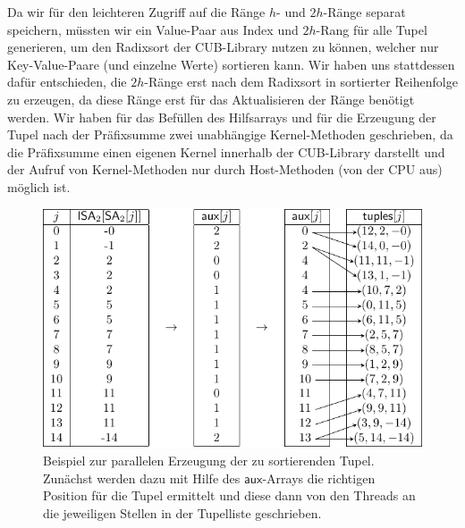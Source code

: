 Da wir für den leichteren Zugriff auf die Ränge $h$- und $2h$-Ränge separat speichern, müssten wir ein Value-Paar aus Index und $2h$-Rang für alle Tupel generieren, um den Radixsort der CUB-Library nutzen zu können, welcher nur Key-Value-Paare (und einzelne Werte) sortieren kann. Wir haben uns stattdessen dafür entschieden, die $2h$-Ränge erst nach dem Radixsort in sortierter Reihenfolge zu erzeugen, da diese Ränge erst für das Aktualisieren der Ränge benötigt werden. Wir haben für das Befüllen des Hilfsarrays und für die Erzeugung der Tupel nach der Präfixsumme zwei unabhängige Kernel-Methoden geschrieben, da die Präfixsumme einen eigenen Kernel innerhalb der CUB-Library darstellt und der Aufruf von Kernel-Methoden nur durch Host-Methoden (von der CPU aus) möglich ist. 
\begin{center}
\begin{figure}
\includegraphics[scale=1]{kapitel/saca_algorithmen/osipov/create_tuple_example.pdf}
\caption{Beispiel zur parallelen Erzeugung der zu sortierenden Tupel. Zunächst werden dazu mit Hilfe des $\mathsf{aux}$-Arrays die richtigen Position für die Tupel ermittelt und diese dann von den Threads an die jeweiligen Stellen in der Tupelliste geschrieben.}
\label{osipov:create}
\end{figure}

\end{center}
